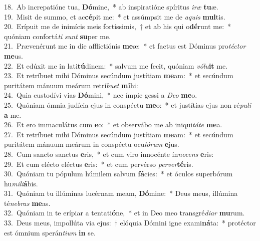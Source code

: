 {18.~}Ab increpatióne tua, \textbf{Dó}mine,~* ab inspiratióne spíritus \textit{i}\textit{ræ} \textbf{tu}æ.\\
{19.~}Misit de summo, et ac\textbf{cé}pit me:~* et assúmpsit me de \textit{a}\textit{quis} \textbf{mul}tis.\\
{20.~}Erípuit me de inimícis meis fortíssimis,~† et ab his qui o\textbf{dé}runt me:~* quóniam confortá\textit{ti} \textit{sunt} \textbf{su}per me.\\
{21.~}Prævenérunt me in die afflictiónis \textbf{me}æ:~* et factus est Dóminus pro\textit{té}\textit{ctor} \textbf{me}us.\\
{22.~}Et edúxit me in lati\textbf{tú}dinem:~* salvum me fecit, quóniam \textit{vó}\textit{lu}\textbf{it} me.\\
{23.~}Et retríbuet mihi Dóminus secúndum justítiam \textbf{me}am:~* et secúndum puritátem mánuum meárum retrí\textit{bu}\textit{et} \textbf{mi}hi:\\
{24.~}Quia custodívi vias \textbf{Dó}mini,~* nec ímpie gessi a \textit{De}\textit{o} \textbf{me}o.\\
{25.~}Quóniam ómnia judícia ejus in conspéctu \textbf{me}o:~* et justítias ejus non ré\textit{pu}\textit{li} \textbf{a} me.\\
{26.~}Et ero immaculátus cum \textbf{e}o:~* et observábo me ab iniqui\textit{tá}\textit{te} \textbf{me}a.\\
{27.~}Et retríbuet mihi Dóminus secúndum justítiam \textbf{me}am:~* et secúndum puritátem mánuum meárum in conspéctu ocu\textit{ló}\textit{rum} \textbf{e}jus.\\
{28.~}Cum sancto sanctus \textbf{e}ris,~* et cum viro innocénte ín\textit{no}\textit{cens} \textbf{e}ris:\\
{29.~}Et cum elécto eléctus \textbf{e}ris:~* et cum pervérso \textit{per}\textit{ver}\textbf{té}ris.\\
{30.~}Quóniam tu pópulum húmilem salvum \textbf{fá}cies:~* et óculos superbórum hu\textit{mi}\textit{li}\textbf{á}bis.\\
{31.~}Quóniam tu illúminas lucérnam meam, \textbf{Dó}mine:~* Deus meus, illúmina té\textit{ne}\textit{bras} \textbf{me}as.\\
{32.~}Quóniam in te erípiar a tentati\textbf{ó}ne,~* et in Deo meo transgré\textit{di}\textit{ar} \textbf{mu}rum.\\
{33.~}Deus meus, impollúta via ejus:~† elóquia Dómini igne exami\textbf{ná}ta:~* protéctor est ómnium sperán\textit{ti}\textit{um} \textbf{in} se.\\
